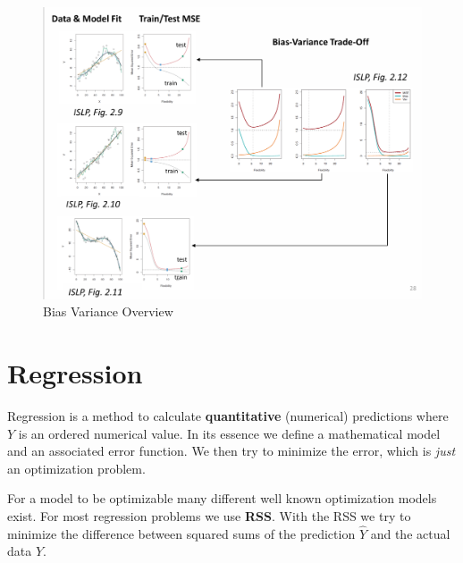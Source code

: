 \documentclass[../Main.tex]{subfiles}
\begin{document}
\begin{figure}[H]
    \centering
    \includegraphics[width=1\linewidth]{Images/bias-variance-tradeoff-overview.png}
    \caption{Bias Variance Overview}
\end{figure}


\newpage
\section{Regression}
Regression is a method to calculate \textbf{quantitative} (numerical) predictions where \(Y\) is an ordered numerical value.
In its essence we define a mathematical model and an associated error function.
We then try to minimize the error, which is \textit{just} an optimization problem.

For a model to be optimizable many different well known optimization models exist.
For most regression problems we use \textbf{RSS}.
With the RSS we try to minimize the difference between squared sums of the prediction \(\hat{Y}\) and the actual data \(Y\).
\end{document}

